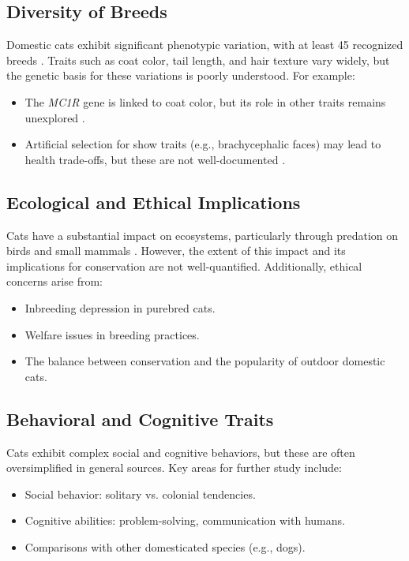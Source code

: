 \documentclass{article}
\begin{document}
\subsection{Diversity of Breeds}
Domestic cats exhibit significant phenotypic variation, with at least 45 recognized breeds \cite{breed_diversity}. Traits such as coat color, tail length, and hair texture vary widely, but the genetic basis for these variations is poorly understood. For example:
\begin{itemize}
    \item The \textit{MC1R} gene is linked to coat color, but its role in other traits remains unexplored \cite{genetic_basis_gap}.
    \item Artificial selection for show traits (e.g., brachycephalic faces) may lead to health trade-offs, but these are not well-documented \cite{health_tradeoffs}.
\end{itemize}

\subsection{Ecological and Ethical Implications}
Cats have a substantial impact on ecosystems, particularly through predation on birds and small mammals \cite{ecological_impact_gap}. However, the extent of this impact and its implications for conservation are not well-quantified. Additionally, ethical concerns arise from:
\begin{itemize}
    \item Inbreeding depression in purebred cats.
    \item Welfare issues in breeding practices.
    \item The balance between conservation and the popularity of outdoor domestic cats.
\end{itemize}

\subsection{Behavioral and Cognitive Traits}
Cats exhibit complex social and cognitive behaviors, but these are often oversimplified in general sources. Key areas for further study include:
\begin{itemize}
    \item Social behavior: solitary vs. colonial tendencies.
    \item Cognitive abilities: problem-solving, communication with humans.
    \item Comparisons with other domesticated species (e.g., dogs).
\end{itemize}
\end{document}
